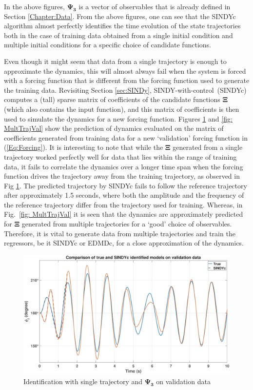 \newpage
In the above figures, $\mathbf{\Psi_3}$ is a vector of observables that is already defined in Section \ref{Chapter:Data}. From the above figures, one can see that the SINDYc algorithm almost perfectly identifies the time evolution of the state trajectories both in the case of training data obtained from a single initial condition and multiple initial conditions for a specific choice of candidate functions.\par
Even though it might seem that data from a single trajectory is enough to approximate the dynamics, this will almost always fail when the system is forced with a forcing function that is different from the forcing function used to generate the training data. Revisiting Section \ref{sec:SINDy}, SINDY-with-control~(SINDYc) computes a (tall) sparse matrix of coefficients of the candidate functions $\mathbf{\Xi}$ (which also contains the input function), and this matrix of coefficients is then used to simulate the dynamics for a new forcing function. Figures \ref{fig:SingleTrajVal} and \ref{fig: MultTrajVal} show the prediction of dynamics evaluated on the matrix of coefficients generated from training data for a new `validation' forcing function in (\ref{Eq:Forcing}). It is interesting to note that while the $\mathbf{\Xi}$ generated from a single trajectory worked perfectly well for data that lies within the range of training data, it fails to correlate the dynamics over a longer time span when the forcing function drives the trajectory away from the training trajectory, as observed in Fig \ref{fig:SingleTrajVal}. The predicted trajectory by SINDYc fails to follow the reference trajectory after approximately 1.5 seconds, where both the amplitude and the frequency of the reference trajectory differ from the trajectory used for training. Whereas, in Fig.~\ref{fig: MultTrajVal} it is seen that the dynamics are approximately predicted for $\mathbf{\Xi}$ generated from multiple trajectories for a `good' choice of observables. Therefore, it is vital to generate data from multiple trajectories and train the regressors, be it SINDYc or EDMDc, for a close approximation of the dynamics. 
% 
\begin{figure}[ht]
    \centering
    \includegraphics[width=1\linewidth]{figures/SingleTrajVal_2_0_1}
    \caption{Identification with single trajectory and $\mathbf{\Psi_3}$ on validation data}
    \label{fig:SingleTrajVal}
\end{figure}
